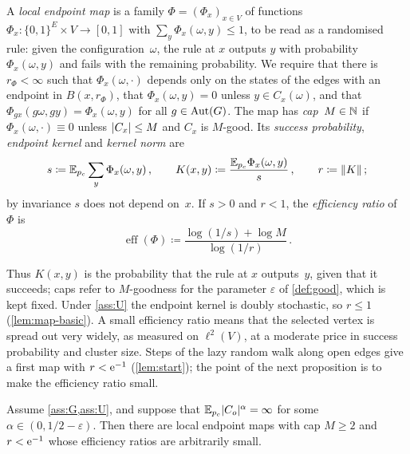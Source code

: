 \begin{definition}\label{def:map}
A \emph{local endpoint map} is a family $\Phi=(\Phi_x)_{x\in V}$ of functions
$\Phi_x\colon\{0,1\}^E\times V\to[0,1]$ with $\sum_y\Phi_x(\omega,y)\le1$, to be read as a randomised
rule: given the configuration~$\omega$, the rule at $x$ outputs $y$ with probability
$\Phi_x(\omega,y)$ and fails with the remaining probability. We require that there is $r_\Phi<\infty$
such that $\Phi_x(\omega,\cdot)$ depends only on the states of the edges with an endpoint in
$B(x,r_\Phi)$, that $\Phi_x(\omega,y)=0$ unless $y\in C_x(\omega)$, and that
$\Phi_{gx}(g\omega,gy)=\Phi_x(\omega,y)$ for all $g\in\operatorname{Aut}(G)$. The map has \emph{cap}~$M\in\mathbb N$ if
$\Phi_x(\omega,\cdot)\equiv0$ unless $\lvert C_x\rvert\le M$ and $C_x$ is $M$-good. Its \emph{success
probability}, \emph{endpoint kernel} and \emph{kernel norm} are
\begin{equation*}
  s\coloneqq\mathbb E_{p_c}\sum_{y}\Phi_x(\omega,y)\,,\qquad
  K(x,y)\coloneqq\frac{\mathbb E_{p_c}\Phi_x(\omega,y)}{s}\,,\qquad
  r\coloneqq\lVert K\rVert\,;
\end{equation*}
by invariance $s$ does not depend on~$x$. If $s>0$ and $r<1$, the \emph{efficiency ratio} of~$\Phi$ is
\begin{equation*}
  \operatorname{eff}(\Phi)\coloneqq\frac{\log(1/s)+\log M}{\log(1/r)}\,.
\end{equation*}
\end{definition}

Thus $K(x,y)$ is the probability that the rule at $x$ outputs~$y$, given that it succeeds; caps refer
to $M$-goodness for the parameter $\varepsilon$ of \cref{def:good}, which is kept fixed. Under
\cref{ass:U} the endpoint kernel is doubly stochastic, so $r\le1$ (\cref{lem:map-basic}). A small
efficiency ratio means that the selected vertex is spread out very widely, as measured on $\ell^2(V)$,
at a moderate price in success probability and cluster size. Steps of the lazy random walk along open
edges give a first map with $r<\mathrm{e}^{-1}$ (\cref{lem:start}); the point of the next proposition is to make
the efficiency ratio small.

\begin{proposition}\label{prop:amplification}
Assume \cref{ass:G,ass:U}, and suppose that $\mathbb E_{p_c}\lvert C_o\rvert^{\alpha}=\infty$ for some
$\alpha\in(0,1/2-\varepsilon)$. Then there are local endpoint maps with cap $M\ge2$ and $r<\mathrm{e}^{-1}$
whose efficiency ratios are arbitrarily small.
\end{proposition}

